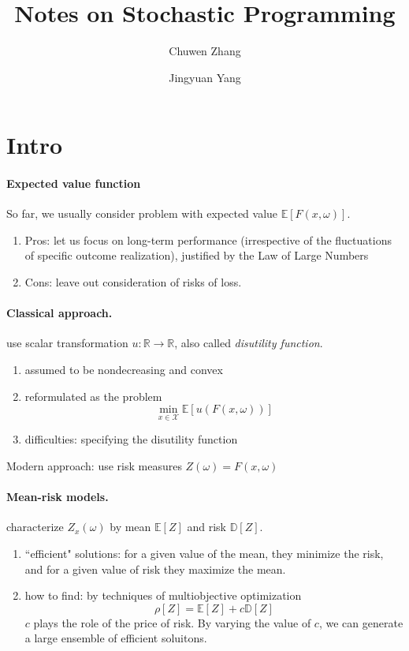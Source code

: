 \documentclass[a4pper,11pt]{article}
\title{Notes on Stochastic Programming}
\newcommand{\br}{\mathbb R}
\newcommand{\be}{\mathbb E}
\begin{document}
\author[1]{\small Chuwen Zhang}
\author[1]{\small Jingyuan Yang}
\maketitle

\section{Intro}
\paragraph{Expected value function}
So far, we usually consider problem with expected value $\be [F(x,\omega)]$.
\begin{enumerate}
	\item Pros: let us focus on long-term performance (irrespective of the fluctuations of specific outcome realization), justified by the Law of Large Numbers
	\item Cons: leave out consideration of risks of loss.
\end{enumerate}
\paragraph{Classical approach.} use scalar transformation $u: \br \to\br$, also called \textit{disutility function}.
\begin{enumerate}
	\item assumed to be nondecreasing and convex
	\item reformulated as the problem
	$$
	\min_{x\in \mathcal X} \be [u(F(x,\omega))]
	$$
	\item difficulties: specifying the disutility function
\end{enumerate}
Modern approach: use risk measures $Z(\omega)=F(x,\omega)$


\paragraph{Mean-risk models.} characterize $Z_x(\omega)$ by mean $\be [Z]$ and risk $\mathbb D[Z]$.
\begin{enumerate}
	\item ``efficient" solutions: for a given value of the mean, they minimize the risk, and for a given value of risk they maximize the mean.
	\item how to find: by techniques of multiobjective optimization
	$$\rho[Z]=\be [Z]+c\mathbb D[Z]$$
	$c$ plays the role of the price of risk.  By varying the value of $c$, we can generate a large ensemble of efficient soluitons. 
	\end{enumerate}
	
\end{document}
